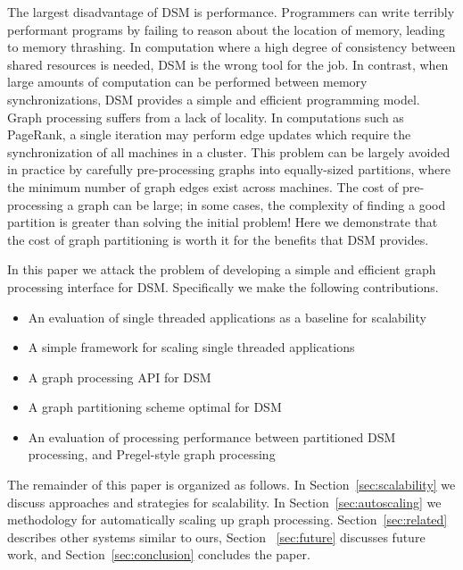 The largest disadvantage of DSM is performance. Programmers can write
terribly performant programs by failing to reason about the location
of memory, leading to memory thrashing. In computation where a high
degree of consistency between shared resources is needed, DSM is the 
wrong tool for the job. In contrast, when large amounts of computation can be
performed between memory synchronizations, DSM provides a simple and
efficient programming model. Graph processing suffers from a lack of
locality. In computations such as PageRank, a single iteration may
perform edge updates which require the synchronization of all
machines in a cluster. This problem can be largely avoided in practice
by carefully pre-processing graphs into equally-sized partitions, where 
the minimum number of graph edges exist across machines. The cost of pre-processing a
graph can be large; in some cases, the complexity of finding a good
partition is greater than solving the initial problem! Here we
demonstrate that the cost of graph partitioning is worth it for the
benefits that DSM provides.

In this paper we attack the problem of developing a simple and
efficient graph processing interface for DSM. Specifically we make the
following contributions.

\begin{itemize}
        \item An evaluation of single threaded applications as a baseline for scalability
        \item A simple framework for scaling single threaded applications
        \item A graph processing API for DSM
        \item A graph partitioning scheme optimal for DSM
        \item An evaluation of processing performance between partitioned DSM processing, and Pregel-style graph processing
\end{itemize}

The remainder of this paper is organized as follows. In
Section~\ref{sec:scalability} we discuss approaches and strategies for 
scalability. In Section~\ref{sec:autoscaling} we methodology for
automatically scaling up graph processing. Section~\ref{sec:related} 
describes other systems similar to ours, Section ~\ref{sec:future} discusses
future work, and Section~\ref{sec:conclusion} concludes the paper.
